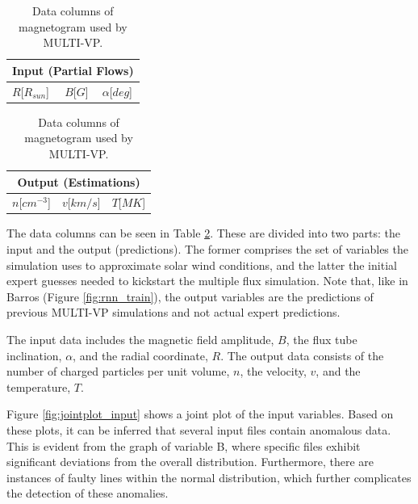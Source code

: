 \begin{table}[h]
    \caption{Data columns of magnetogram used by MULTI-VP.}
    \label{tab:multivp_columns}
    \begin{subtable}[h]{0.32\textwidth}
        \centering
        \begin{tabular}{lcc}
        \hline
        \multicolumn{3}{c}{Input (Partial Flows)}                              \\ \hline
        $R${[}$R_{sun}${]} & $B${[}$G${]} & $\alpha${[}$deg${]} \\ \hline
        \end{tabular}
    \end{subtable}
    \begin{subtable}[h]{0.32\textwidth}
        \centering
        \begin{tabular}{ccc}
        \hline
        \multicolumn{3}{c}{Output (Estimations)}                           \\ \hline
        $n${[}$cm^{-3}${]} & $v${[}$km/s${]} & $T${[}$MK${]} \\ \hline
        \end{tabular}
    \end{subtable}
\end{table}

The data columns can be seen in Table \ref{tab:multivp_columns}. These are divided into two parts: the input and the output (predictions). The former comprises the set of variables the simulation uses to approximate solar wind conditions, and the latter the initial expert guesses needed to kickstart the multiple flux simulation. Note that, like in Barros \cite{barros_InitialConditionEstimation_} (Figure \ref{fig:rnn_train}), the output variables are the predictions of previous MULTI-VP simulations and not actual expert predictions.

The input data includes the magnetic field amplitude, $B$, the flux tube inclination, $\alpha$, and the radial coordinate, $R$. The output data consists of the number of charged particles per unit volume, $n$, the velocity, $v$, and the temperature, $T$.



Figure \ref{fig:jointplot_input} shows a joint plot of the input variables. Based on these plots, it can be inferred that several input files contain anomalous data. This is evident from the graph of variable B, where specific files exhibit significant deviations from the overall distribution. Furthermore, there are instances of faulty lines within the normal distribution, which further complicates the detection of these anomalies.


